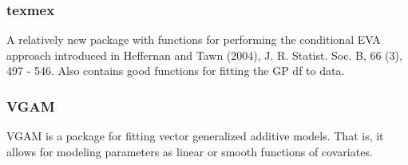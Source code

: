 \documentclass[MAIN.tex]{subfiles}
\begin{document}
\begin{frame}
	\frametitle{texmex}
	
	A relatively new package with functions for performing the conditional EVA approach introduced in Heffernan and Tawn (2004), J. R. Statist. Soc. B, 66 (3), 497 - 546. Also contains good functions for fitting the GP df to data.
\end{frame}
\begin{frame}
\frametitle{VGAM}
	
	VGAM is a package for fitting vector generalized additive models. That is, it allows for modeling parameters as linear or smooth functions of covariates.
\end{frame}
\end{document}
